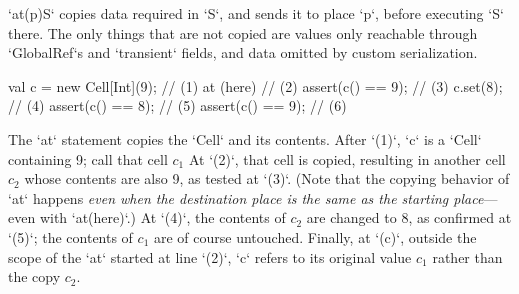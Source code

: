 \xcd`at(p)S` copies data required in \xcd`S`, and sends it
to place \xcd`p`, before executing \xcd`S` there. The only things that are not
copied are values only reachable through \xcd`GlobalRef`s and \xcd`transient`
fields, and data omitted by custom serialization.    

\begin{ex}

% 
\begin{xten}
val c = new Cell[Int](9); // (1)
at (here) {               // (2) 
   assert(c() == 9);      // (3)
   c.set(8);              // (4)
   assert(c() == 8);      // (5)
}
assert(c() == 9);         // (6)
\end{xten}


The \xcd`at` statement copies the \xcd`Cell` and its contents.  
After \xcd`(1)`, \xcd`c` is a \xcd`Cell` containing 9; call that cell {$c_1$}
At \xcd`(2)`, that cell is copied, resulting in another cell {$c_2$} whose
contents are also 9, as tested at \xcd`(3)`.
(Note that the copying behavior of \xcd`at` happens {\em even when the
destination place is the same as the starting place}--- even with
\xcd`at(here)`.)
At \xcd`(4)`, the contents of {$c_2$} are changed to 8, as confirmed at \xcd`(5)`; the contents of
{$c_1$} are of course untouched.    Finally, at \xcd`(c)`, outside the scope
of the \xcd`at` started at line \xcd`(2)`, \xcd`c` refers to its original
value {$c_1$} rather than the copy {$c_2$}.  
\end{ex}

